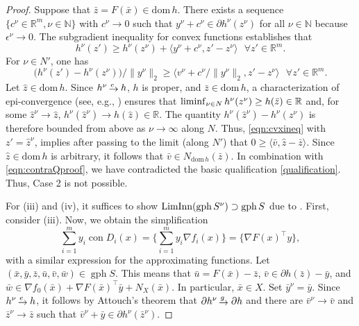 \documentclass[smallextended,envcountsect]{svjour3}
\newcommand{\dom}[1]{\mathrm{dom}\, #1} %
\newcommand{\nats}{\mathbb{N}}
\newcommand{\reals}{\mathbb{R}}
\newcommand{\nInnLim}{\mathop{\rm LimInn}\nolimits}
\newcommand{\nliminf}{\mathop{\rm liminf}\nolimits}
\DeclareMathOperator{\con}{con}
\DeclareMathOperator{\gph}{gph}
\newcommand{\eto}{\,{\lower 1pt\hbox{$\rightarrow$}}\kern -10pt
     \hbox{\raise 4pt \hbox{$\, \scriptstyle e$}}\hskip7pt}
\newcommand{\gto}{\,{\lower 1pt\hbox{$\rightarrow$}}\kern -10pt
     \hbox{\raise 4.5pt \hbox{$\, \scriptstyle g$}}\hskip7pt}
\begin{document}
\begin{proof}
Suppose that $\bar z = F(\bar x) \in \dom h$. There exists a sequence $\{c^\nu \in \reals^m, \nu\in\nats\}$ with $c^\nu \to 0$ such that $y^\nu + c^\nu \in \partial h^\nu(z^\nu)$ for all $\nu\in\nats$ because $\epsilon^\nu\to 0$. The subgradient inequality for convex functions establishes that 
\[
h^\nu(z') \geq h^\nu(z^\nu) + \langle y^\nu + c^\nu, z' - z^\nu\rangle ~~~\forall z' \in \reals^m.
\]
For $\nu\in N'$, one has
\begin{equation}\label{eqn:cvxineq}
\big(h^\nu(z') - h^\nu(z^\nu)\big)/\|y^\nu\|_2\geq   \big\langle v^\nu + c^\nu/\|y^\nu\|_2, z' - z^\nu\big\rangle ~~~\forall z' \in \reals^m.
\end{equation}
Let $\hat z \in \dom h$. Since $h^\nu\eto h$, $h$ is proper, and $\bar z\in \dom h$, a characterization of epi-convergence (see, e.g., \cite[Theorem 4.15]{Royset_Wets_2021}) ensures that $\nliminf_{\nu\in N} h^\nu(z^\nu) \geq h(\bar z) \in \reals$ and, for some $\hat z^\nu\to \hat z$, $h^\nu(\hat z^\nu) \to h(\hat z)\in\reals$. The quantity $h^\nu(\hat z^\nu) - h^\nu(z^\nu)$ is therefore bounded from above as $\nu\to \infty$ along $N$. Thus, \eqref{eqn:cvxineq} with $z' = \hat z^\nu$, implies after passing to the limit (along $N'$) that $0 \geq \langle \bar v, \hat z - \bar z\rangle$. Since $\hat z \in \dom h$ is arbitrary, it follows that $\bar v \in N_{\dom h}(\bar z)$. In combination with \eqref{eqn:contraQproof}, we have contradicted the basic qualification \eqref{qualification}. Thus, Case 2 is not possible.

\medskip

For (iii) and (iv), it suffices to show $\nInnLim (\gph S^\nu) \supset \gph S$ due to \cite[Theorem 5.37(b)]{Rockafellar_Wets_1998}. First, consider (iii). Now, we obtain the simplification
\[
\sum_{i=1}^m y_i \con D_i(x) = \Big\{\sum_{i=1}^m y_i \nabla f_i(x)\Big\} = \big\{\nabla F(x)^\top y\big\},
\]
with a similar expression for the approximating functions. Let $(\bar x, \bar y, \bar z, \bar u, \bar v, \bar w) \in \gph S$. This means that $\bar u = F(\bar x) - \bar z$, $\bar v \in \partial h(\bar z)- \bar y$, and $\bar w \in \nabla f_0(\bar x) + \nabla F(\bar x)^\top \bar y + N_{X}(\bar x)$.
In particular, $\bar x\in X$. Set $\bar y^\nu = \bar y$. Since $h^\nu\eto h$, it follows by Attouch's theorem that $\partial h^\nu \gto \partial h$ and there are $\bar v^\nu \to \bar v$ and $\bar z^\nu\to \bar z$ such that $\bar v^\nu + \bar y \in \partial h^\nu(\bar z^\nu)$.


\end{proof}
\end{document}
